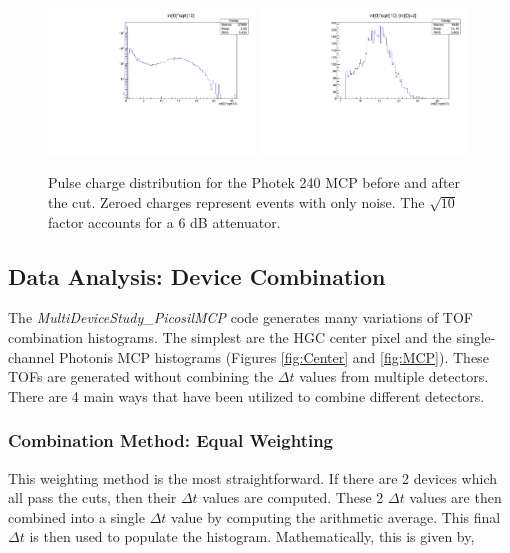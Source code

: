 \documentclass[12pt]{article}
\begin{document}
\begin{figure}[h]
\centering
	\includegraphics[width=0.49\textwidth]{ChargeCut0.pdf}
	\includegraphics[width=0.49\textwidth]{ChargeCut1.pdf}
	\caption{Pulse charge distribution for the Photek 240 MCP before and after the cut.
		Zeroed charges represent events with only noise.
		The $\sqrt{10}$ factor accounts for a 6 dB attenuator.}
	\label{fig:ChargeCut}
\end{figure}

\subsection{Data Analysis: Device Combination}
The \textit{MultiDeviceStudy\_PicosilMCP} code generates many variations of TOF combination histograms. 
The simplest are the HGC center pixel and the single-channel Photonis MCP histograms (Figures \ref{fig:Center} and \ref{fig:MCP}). 
These TOFs are generated without combining the $\Delta t$ values from multiple detectors. 
There are 4 main ways that have been utilized to combine different detectors.

\subsubsection{Combination Method: Equal Weighting}
This weighting method is the most straightforward. 
If there are 2 devices which all pass the cuts, then their $\Delta t$ values are computed. 
These 2 $\Delta t$ values are then combined into a single $\Delta t$ value by computing the arithmetic average. 
This final $\Delta t$ is then used to populate the histogram. 
Mathematically, this is given by,
\end{document}
